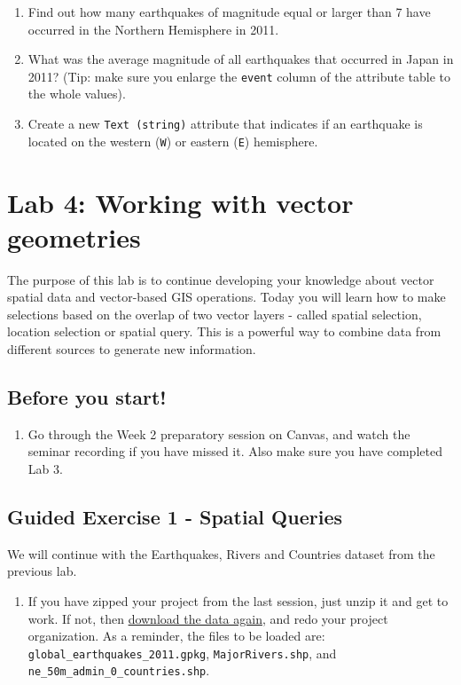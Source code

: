 \documentclass[
  letterpaper,
  DIV=11,
  numbers=noendperiod]{scrreprt}
\providecommand{\tightlist}{%
  \setlength{\itemsep}{0pt}\setlength{\parskip}{0pt}}\usepackage{longtable,booktabs,array}
\begin{document}
\begin{enumerate}
\def\labelenumi{\arabic{enumi})}
\item
  Find out how many earthquakes of magnitude equal or larger than 7 have
  occurred in the Northern Hemisphere in 2011.
\item
  What was the average magnitude of all earthquakes that occurred in
  Japan in 2011? (Tip: make sure you enlarge the \texttt{event} column
  of the attribute table to the whole values).
\item
  Create a new \texttt{Text\ (string)} attribute that indicates if an
  earthquake is located on the western (\texttt{W}) or eastern
  (\texttt{E}) hemisphere.
\end{enumerate}

\chapter{Lab 4: Working with vector geometries}\label{sec-labvec2}

The purpose of this lab is to continue developing your knowledge about
vector spatial data and vector-based GIS operations. Today you will
learn how to make selections based on the overlap of two vector layers -
called spatial selection, location selection or spatial query. This is a
powerful way to combine data from different sources to generate new
information.

\section{Before you start!}\label{before-you-start-2}

\begin{enumerate}
\def\labelenumi{\arabic{enumi}.}
\tightlist
\item
  Go through the Week 2 preparatory session on Canvas, and watch the
  seminar recording if you have missed it. Also make sure you have
  completed Lab 3.
\end{enumerate}

\section{Guided Exercise 1 - Spatial
Queries}\label{guided-exercise-1---spatial-queries}

We will continue with the Earthquakes, Rivers and Countries dataset from
the previous lab.

\begin{enumerate}
\def\labelenumi{(\arabic{enumi})}
\setcounter{enumi}{102}
\tightlist
\item
  If you have zipped your project from the last session, just unzip it
  and get to work. If not, then
  \href{https://stir-my.sharepoint.com/:f:/g/personal/ala2_stir_ac_uk/EkD-gndA8ihElmcQFirYbPEBN6qvH2tzyLgJ8UujpCXi2Q?e=tsvmoG}{download
  the data again}, and redo your project organization. As a reminder,
  the files to be loaded are: \texttt{global\_earthquakes\_2011.gpkg},
  \texttt{MajorRivers.shp}, and
  \texttt{ne\_50m\_admin\_0\_countries.shp}.
\end{enumerate}
\end{document}
